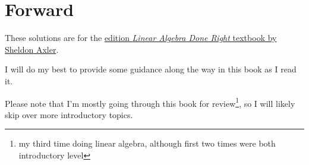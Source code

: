 \documentclass[titlepage]{book}
\begin{document}
\maketitle

\frontmatter
\tableofcontents

\chapter*{Forward}

These solutions are for the \href{https://amzn.to/3xtpz2g}{ edition \textit{Linear Algebra Done Right} textbook by Sheldon Axler}.

I will do my best to provide some guidance along the way in this book as I read it.

Please note that I'm mostly going through this book for review\footnote{my third time doing linear algebra, although first two times were both introductory level}, so I will likely skip over more introductory topics.

\mainmatter




\appendix
\end{document}
